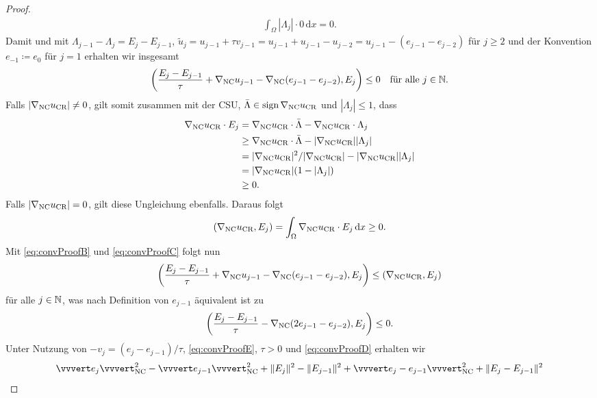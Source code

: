 \begin{proof}
\begin{align*}
    \int_\Omega |\Lambda_j|\cdot
    0\,\mathrm dx =0.
  \end{align*}
  Damit und mit $\Lambda_{j-1}-\Lambda_j=E_j-E_{j-1}$, 
  $\tilde{u}_j=u_{j-1}+\tau v_{j-1}=u_{j-1}+u_{j-1}-u_{j-2}=
  u_{j-1}-(e_{j-1}-e_{j-2})$
  für $j\geq 2$ und der Konvention $e_{-1}\coloneqq e_0$ für $j=1$ erhalten wir
  insgesamt
  \begin{align}
    \label{eq:convProofB}
    \left(\frac{E_j-E_{j-1}}{\tau}+ \nabla_\textup{NC} u_{j-1}-\nabla_\textup{NC}
    (e_{j-1}-e_{j-2}),E_j\right)\leq 0\quad\text{für alle }
    j\in\mathbb{N}.
  \end{align}
  Falls $|\nabla_\textup{NC} u_\textup{CR}|\neq 0$, gilt somit zusammen mit
  der CSU, $\bar\Lambda\in\operatorname{sign}\nabla_\textup{NC}u_\textup{CR}$ und $|\Lambda_j|\leq 1$,  dass
  \begin{align*}
    \nabla_\textup{NC}u_\textup{CR}\cdot E_j 
    &=
    \nabla_\textup{NC}u_\textup{CR}\cdot\bar\Lambda - \nabla_\textup{NC}u_\textup{CR}\cdot\Lambda_j\\
    &\geq 
    \nabla_\textup{NC}u_\textup{CR}\cdot\bar\Lambda - |\nabla_\textup{NC}u_\textup{CR}||\Lambda_j| \\
    &=
    |\nabla_\textup{NC}u_\textup{CR}|^2/|\nabla_\textup{NC}u_\textup{CR}|-|\nabla_\textup{NC}u_\textup{CR}||\Lambda_j| \\
    &= 
    |\nabla_\textup{NC}u_\textup{CR}|(1-|\Lambda_j|)\\
    &\geq
    0. 
  \end{align*}
  Falls $|\nabla_\textup{NC}u_\textup{CR}|=0$, gilt diese Ungleichung ebenfalls.
  Daraus folgt
  \begin{align}
    \label{eq:convProofC}
    (\nabla_\textup{NC}u_\textup{CR},E_j)=\int_\Omega \nabla_\textup{NC}u_\textup{CR}\cdot E_j\,\mathrm{d}x\geq 0.
  \end{align}
  Mit \eqref{eq:convProofB} und \eqref{eq:convProofC} folgt nun
  \begin{align*}
    \left( \frac{E_j-E_{j-1}}{\tau}+ \nabla_\textup{NC} u_{j-1}
    -\nabla_{\textup{NC}}(e_{j-1}-e_{j-2}),E_j\right)
    \leq
    (\nabla_\textup{NC}u_\textup{CR},E_j)
  \end{align*}
  für alle $j\in\mathbb{N}$, was nach Definition von $e_{j-1}$
  äquivalent ist zu
  \begin{align}
    \label{eq:convProofD}
    \left( \frac{E_j-E_{j-1}}{\tau} 
    -\nabla_\textup{NC}(2e_{j-1}-e_{j-2}),E_j\right)\leq 0.
  \end{align}
  Unter Nutzung von $-v_j=(e_j-e_{j-1})/\tau$, \eqref{eq:convProofE}, $\tau>0$
  und \eqref{eq:convProofD} erhalten wir 
  \begin{align*}
    &\vvvert e_j \vvvert^2_\nc   -
    \vvvert e_{j-1}\vvvert_\nc^2 +
    \Vert E_j \Vert^2 - \Vert E_{j-1}\Vert^2 +
    \vvvert e_j-e_{j-1}\vvvert_\nc^2 +
    \Vert E_j - E_{j-1} \Vert^2\\

\end{align*}
\end{proof}
